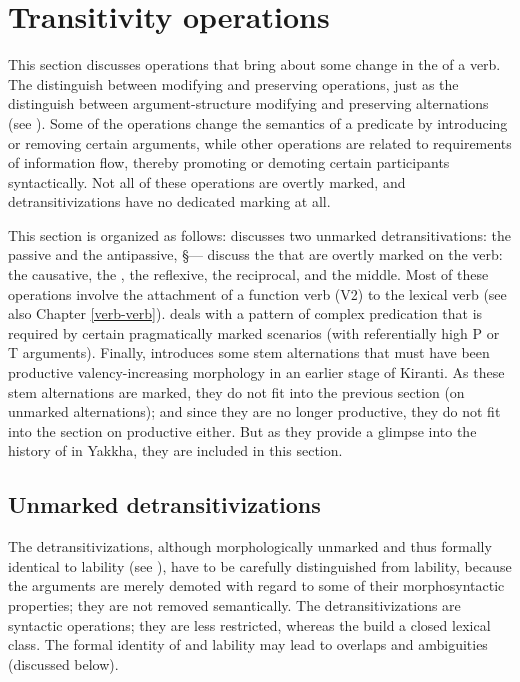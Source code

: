 \section{Transitivity operations}\label{trans-op}

This section discusses operations that bring about some change in the  of a verb. The  distinguish between  modifying and  preserving operations, just as the  distinguish between argument-structure modifying and preserving alternations (see  ). Some of the operations change the semantics of a predicate by introducing or removing certain arguments, while other operations are related to requirements of information flow, thereby promoting or demoting certain participants syntactically. Not all of these operations are overtly marked, and detransitivizations have no dedicated marking at all.  

This section is organized as follows:  discusses two unmarked detransitivations: the passive and the antipassive, §— discuss the  that are overtly marked on the verb: the causative, the , the reflexive, the  reciprocal, and the middle. Most of these operations involve the attachment of a function verb  (V2) to the lexical verb (see also Chapter \ref{verb-verb}).  deals with a pattern of complex predication that is required by certain pragmatically marked scenarios (with referentially high P or T arguments). Finally,  introduces some stem alternations that must have been productive valency-increasing morphology  in an earlier stage of Kiranti. As these stem alternations are marked, they do not fit into the previous section (on unmarked alternations); and since they are no longer productive, they do not fit into the section on productive  either. But as they provide a glimpse into the history of  in Yakkha, they are included in this section.

\subsection{Unmarked detransitivizations}\label{detrans}

The detransitivizations, although morphologically unmarked and thus  formally identical to lability (see ), have to be carefully distinguished from lability, because the arguments are merely demoted with regard to some of their morphosyntactic properties; they are not removed semantically. The detransitivizations are syntactic operations; they are less restricted, whereas the  build a closed lexical class. The formal identity of  and lability may lead to overlaps and ambiguities (discussed below).

